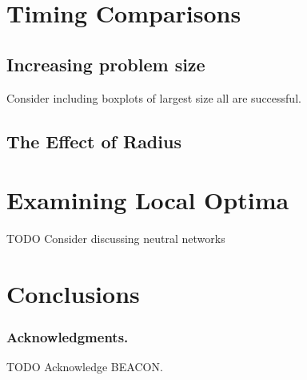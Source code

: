 \documentclass[runningheads,a4paper]{llncs}
\begin{document}
\section{Timing Comparisons}
\subsection{Increasing problem size}
Consider including boxplots of largest size all are successful.

\subsection{The Effect of Radius}

\section{Examining Local Optima}

TODO Consider discussing neutral networks

\section{Conclusions}

\subsubsection*{Acknowledgments.} TODO Acknowledge BEACON.



\end{document}
